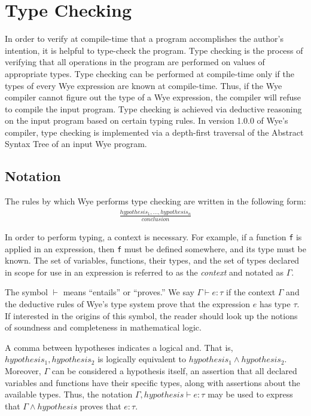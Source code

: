 \documentclass[a4paper, 12pt]{article}
\newcommand{\version}{1.0.0}
\begin{document}
\section{Type Checking}

In order to verify at compile-time that a program accomplishes the author's intention, it is helpful to type-check the program. Type checking is the process of verifying that all operations in the program are performed on values of appropriate types. Type checking can be performed at compile-time only if the types of every Wye expression are known at compile-time. Thus, if the Wye compiler cannot figure out the type of a Wye expression, the compiler will refuse to compile the input program. Type checking is achieved via deductive reasoning on the input program based on certain typing rules. In version \version{} of Wye's compiler, type checking is implemented via a depth-first traversal of the Abstract Syntax Tree of an input Wye program.

\subsection{Notation}

The rules by which Wye performs type checking are written in the following form:
\begin{align*}
\frac{hypothesis_1, ..., hypothesis_n}{conclusion}
\end{align*}

In order to perform typing, a context is necessary. For example, if a function \texttt{f} is applied in an expression, then \texttt{f} must be defined somewhere, and its type must be known. The set of variables, functions, their types, and the set of types declared in scope for use in an expression is referred to as the \textit{context} and notated as $\Gamma$.

The symbol $\vdash$ means ``entails'' or ``proves.'' We say $\Gamma\vdash e: \tau$ if the context $\Gamma$ and the deductive rules of Wye's type system prove that the expression $e$ has type $\tau$. If interested in the origins of this symbol, the reader should look up the notions of soundness and completeness in mathematical logic.

A comma between hypotheses indicates a logical and. That is, $hypothesis_1, hypothesis_2$ is logically equivalent to $hypothesis_1 \wedge hypothesis_2$. Moreover, $\Gamma$ can be considered a hypothesis itself, an assertion that all declared variables and functions have their specific types, along with assertions about the available types. Thus, the notation $\Gamma, hypothesis \vdash e: \tau$ may be used to express that $\Gamma \wedge hypothesis$ proves that $e: \tau$.
\end{document}
